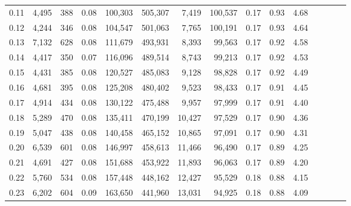 \begin{tabular}{rrrcrrrrrrrrrrr}
0.11 &   4,495 &     388 &                                       0.08 &  100,303 &  505,307 &    7,419 &  100,537 &  0.17 &  0.93 &                         4.68 \\
0.12 &   4,244 &     346 &                                       0.08 &  104,547 &  501,063 &    7,765 &  100,191 &  0.17 &  0.93 &                         4.64 \\
0.13 &   7,132 &     628 &                                       0.08 &  111,679 &  493,931 &    8,393 &   99,563 &  0.17 &  0.92 &                         4.58 \\
0.14 &   4,417 &     350 &                                       0.07 &  116,096 &  489,514 &    8,743 &   99,213 &  0.17 &  0.92 &                         4.53 \\
0.15 &   4,431 &     385 &                                       0.08 &  120,527 &  485,083 &    9,128 &   98,828 &  0.17 &  0.92 &                         4.49 \\
0.16 &   4,681 &     395 &                                       0.08 &  125,208 &  480,402 &    9,523 &   98,433 &  0.17 &  0.91 &                         4.45 \\
0.17 &   4,914 &     434 &                                       0.08 &  130,122 &  475,488 &    9,957 &   97,999 &  0.17 &  0.91 &                         4.40 \\
0.18 &   5,289 &     470 &                                       0.08 &  135,411 &  470,199 &   10,427 &   97,529 &  0.17 &  0.90 &                         4.36 \\
0.19 &   5,047 &     438 &                                       0.08 &  140,458 &  465,152 &   10,865 &   97,091 &  0.17 &  0.90 &                         4.31 \\
0.20 &   6,539 &     601 &                                       0.08 &  146,997 &  458,613 &   11,466 &   96,490 &  0.17 &  0.89 &                         4.25 \\
0.21 &   4,691 &     427 &                                       0.08 &  151,688 &  453,922 &   11,893 &   96,063 &  0.17 &  0.89 &                         4.20 \\
0.22 &   5,760 &     534 &                                       0.08 &  157,448 &  448,162 &   12,427 &   95,529 &  0.18 &  0.88 &                         4.15 \\
0.23 &   6,202 &     604 &                                       0.09 &  163,650 &  441,960 &   13,031 &   94,925 &  0.18 &  0.88 &                         4.09 \\

\end{tabular}
